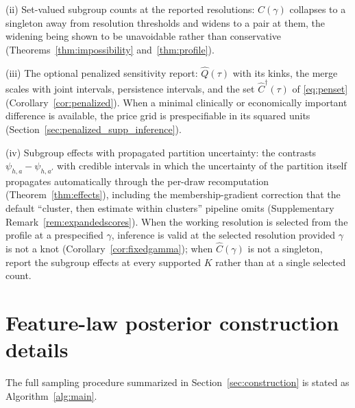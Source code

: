 \documentclass[11pt]{article}
\begin{document}
(ii) Set-valued subgroup counts at the reported resolutions: $\widehat C(\gamma)$ collapses to a singleton away from resolution thresholds and widens to a pair at them, the widening being shown to be unavoidable rather than conservative (Theorems~\ref{thm:impossibility} and~\ref{thm:profile}).

(iii) The optional penalized sensitivity report: $\widehat Q(\tau)$ with its kinks, the merge scales with joint intervals, persistence intervals, and the set $\widehat C^\dagger(\tau)$ of \eqref{eq:penset} (Corollary~\ref{cor:penalized}). When a minimal clinically or economically important difference is available, the price grid is prespecifiable in its squared units (Section~\ref{sec:penalized_supp_inference}).


(iv) Subgroup effects with propagated partition uncertainty: the contrasts $\psi_{h,a}-\psi_{h,a'}$ with credible intervals in which the uncertainty of the partition itself propagates automatically through the per-draw recomputation (Theorem~\ref{thm:effects}), including the membership-gradient correction that the default ``cluster, then estimate within clusters'' pipeline omits (Supplementary Remark~\ref{rem:expandedscores}). When the working resolution is selected from the profile at a prespecified $\gamma$, inference is valid at the selected resolution provided $\gamma$ is not a knot (Corollary~\ref{cor:fixedgamma}); when $\widehat C(\gamma)$ is not a singleton, report the subgroup effects at every supported $K$ rather than at a single selected count.







\section{Feature-law posterior construction details}\label{app:posterior_details}

The full sampling procedure summarized in Section~\ref{sec:construction} is stated as Algorithm~\ref{alg:main}.
\end{document}
